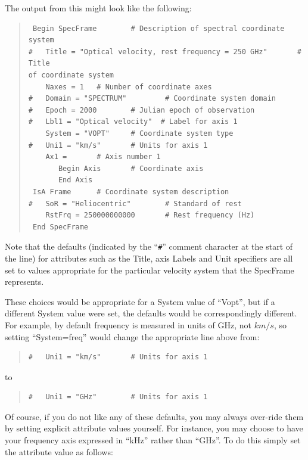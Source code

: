 \documentclass[twoside,11pt]{article}
\begin{document}
The output from this might look like the following:

\begin{quote}
\begin{verbatim}
 Begin SpecFrame        # Description of spectral coordinate system
#   Title = "Optical velocity, rest frequency = 250 GHz"       # Title
of coordinate system
    Naxes = 1   # Number of coordinate axes
#   Domain = "SPECTRUM"         # Coordinate system domain
#   Epoch = 2000        # Julian epoch of observation
#   Lbl1 = "Optical velocity"  # Label for axis 1
    System = "VOPT"     # Coordinate system type
#   Uni1 = "km/s"       # Units for axis 1
    Ax1 =       # Axis number 1
       Begin Axis       # Coordinate axis
       End Axis
 IsA Frame      # Coordinate system description
#   SoR = "Heliocentric"        # Standard of rest
    RstFrq = 250000000000       # Rest frequency (Hz)
 End SpecFrame
\end{verbatim}
\end{quote}

Note that the defaults (indicated by the ``\verb?#?'' comment
character at the start of the line) for attributes such as the Title,
axis Labels and Unit specifiers are all set to values appropriate
for the particular velocity system that the SpecFrame represents.

These choices would be appropriate for a System value of ``Vopt'',
but if a different System value were set, the defaults would be
correspondingly different. For example, by default frequency is measured in 
units of GHz, not $km/s$, so setting ``System=freq''
would change the appropriate line above from:

\begin{quote}
\begin{verbatim}
#   Uni1 = "km/s"       # Units for axis 1
\end{verbatim}
\end{quote}

to

\begin{quote}
\begin{verbatim}
#   Uni1 = "GHz"        # Units for axis 1
\end{verbatim}
\end{quote}

Of course, if you do not like any of these defaults, you may always
over-ride them by setting explicit attribute values yourself. For
instance, you may choose to have your frequency axis expressed in ``kHz''
rather than ``GHz''. To do this simply set the attribute value as follows:
\end{document}
